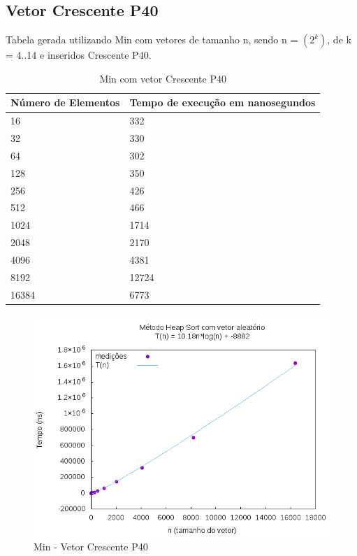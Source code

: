 \documentclass[12pt,a4paper,twoside]{report}
\begin{document}
\subsection{Vetor Crescente P40}
Tabela gerada utilizando Min com vetores de tamanho n, sendo n = $(2^k)$, de k = 4..14 e inseridos Crescente P40.
\begin{table}[H]
\centering
\caption{Min com vetor Crescente P40}
\label{my-label}
\begin{tabular}{|l|l|}
\hline
\multicolumn{1}{|c|}{\textbf{Número de Elementos}} & \multicolumn{1}{c|}{\textbf{Tempo de execução em nanosegundos}} \\ \hline
16 & 332 \\ \hline
32 & 330 \\ \hline
64 & 302 \\ \hline
128 & 350 \\ \hline
256 & 426 \\ \hline
512 & 466 \\ \hline
1024 & 1714 \\ \hline
2048 & 2170 \\ \hline
4096 & 4381 \\ \hline
8192 & 12724 \\ \hline
16384 & 6773 \\ \hline

\end{tabular}
\end{table}

\begin{figure}[H]
    \centering
    \includegraphics[width=0.7\linewidth]{graficos/HeapSort/vIntAleatorio/vIntAleatorio.png}
  \caption{Min - Vetor Crescente P40}
\end{figure}
\end{document}
